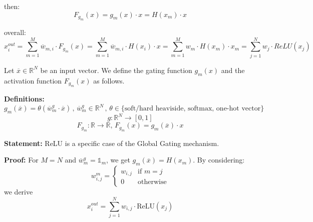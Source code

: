 then:
\begin{equation}
    F_{g_m}(x) = g_m(x) \cdot x = H(x_m) \cdot x
\end{equation}

overall:
\begin{equation}
    x_i^{out} = \sum_{m=1}^M \overline{w}_{m, i} \cdot F_{g_m}(x) = \sum_{m=1}^M \overline{w}_{m, i} \cdot H(x_i)\cdot x = \sum_{m=1}^M w_m \cdot H(x_m) \cdot x_m = \sum_{j=1}^N w_j \cdot ReLU(x_j)
\end{equation}




Let $\overline{x} \in \mathbb{R}^N$ be an input vector. We define the gating function $g_m(x)$ and the activation function $F_{g_m}(x)$ as follows.

\textbf{Definitions:}
\begin{equation}
g_m(\overline{x}) = \theta(\overline{w}_m^g \cdot \overline{x}) \, , \, \overline{w}_m^g \in \mathbb{R}^N \, , \, \theta \in \{\text{soft/hard heaviside, softmax, one-hot vector}\}
\end{equation}
\begin{equation}
    g : \mathbb{R}^N \rightarrow [0, 1]
\end{equation}
\begin{equation}
F_{g_m} : \mathbb{R} \rightarrow \mathbb{R} , \, F_{g_m}(x) = g_m(\overline{x}) \cdot x
\end{equation}

\textbf{Statement:}
ReLU is a specific case of the Global Gating mechanism.

\textbf{Proof:}
For $M=N$ and $\overline{w}_m^g = \mathbb{1}_m$, we get $g_m(\overline{x}) = H(x_m)$. 
By considering:
\begin{equation}
w_{i, j}^m = 
\begin{cases}
    w_{i, j} & \text{if } m = j \\
    0 & \text{otherwise}
\end{cases}
\end{equation}
we derive
\begin{equation}
x_i^{out} = \sum_{j=1}^N w_{i, j} \cdot \text{ReLU}(x_j)
\end{equation}
